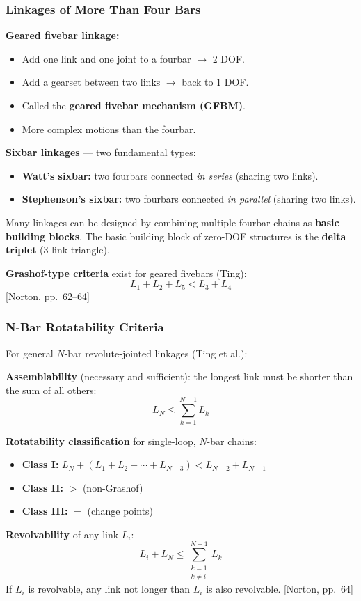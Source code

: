 \documentclass[10pt,aspectratio=43]{beamer}
\newcommand{\pref}[1]{\vfill\hfill{\scriptsize\color{gray}[Norton, pp.~#1]}}
\begin{document}
\begin{frame}
\frametitle{Linkages of More Than Four Bars}

\textbf{Geared fivebar linkage:}
\begin{itemize}
  \item Add one link and one joint to a fourbar $\to$ 2 DOF.
  \item Add a gearset between two links $\to$ back to 1 DOF.
  \item Called the \textbf{geared fivebar mechanism (GFBM)}.
  \item More complex motions than the fourbar.
\end{itemize}

\vspace{6pt}
\textbf{Sixbar linkages} --- two fundamental types:
\begin{itemize}
  \item \textbf{Watt's sixbar:} two fourbars connected \emph{in series} (sharing two links).
  \item \textbf{Stephenson's sixbar:} two fourbars connected \emph{in parallel} (sharing two links).
\end{itemize}

\vspace{4pt}
Many linkages can be designed by combining multiple fourbar chains as \textbf{basic building blocks}. The basic building block of zero-DOF structures is the \textbf{delta triplet} (3-link triangle).

\vspace{4pt}
\textbf{Grashof-type criteria} exist for geared fivebars (Ting):
\[
  L_1 + L_2 + L_5 < L_3 + L_4 \tag{2.12}
\]
\pref{62--64}
\end{frame}

\begin{frame}
\frametitle{N-Bar Rotatability Criteria}

For general $N$-bar revolute-jointed linkages (Ting et al.):

\vspace{4pt}
\textbf{Assemblability} (necessary and sufficient): the longest link must be shorter than the sum of all others:
\[
  L_N \leq \sum_{k=1}^{N-1} L_k \tag{2.13}
\]

\textbf{Rotatability classification} for single-loop, $N$-bar chains:
\begin{yellowbox}
\begin{itemize}
  \item \textbf{Class I:} $L_N + (L_1 + L_2 + \cdots + L_{N-3}) < L_{N-2} + L_{N-1}$
  \item \textbf{Class II:} $>$ (non-Grashof)
  \item \textbf{Class III:} $=$ (change points)
\end{itemize}
\end{yellowbox}

\vspace{4pt}
\textbf{Revolvability} of any link $L_i$:
\[
  L_i + L_N \leq \sum_{\substack{k=1 \\ k \neq i}}^{N-1} L_k \tag{2.16}
\]
If $L_i$ is revolvable, any link not longer than $L_i$ is also revolvable.
\pref{64}
\end{frame}
\end{document}

